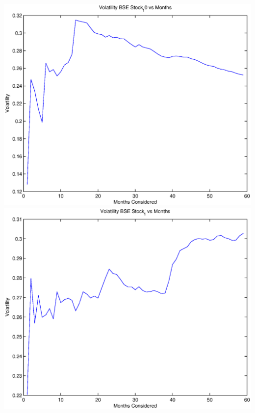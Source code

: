 \documentclass{article}
\begin{document}
\includegraphics[width=\textwidth]{Volatility_BSE_Stock_10_vs_Months} \\

\includegraphics[width=\textwidth]{Volatility_BSE_Stock_1_vs_Months} \\
\end{document}

